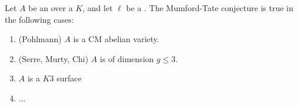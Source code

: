 \begin{theorem}
    Let $A$ be an  over a  $K$, and let $\ell$ be a .
The Mumford-Tate conjecture is true in the following cases:
\begin{enumerate}
    \item (Pohlmann) $A$ is a CM abelian variety.
    \item (Serre, Murty, Chi) $A$ is of dimension $g \leq 3$. 
    \item $A$ is a $K3$ surface 
    \item ...
\end{enumerate}
\end{theorem}